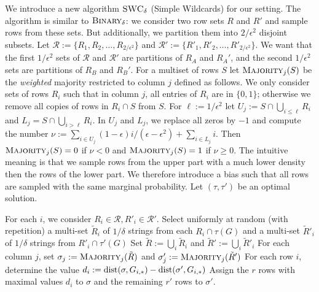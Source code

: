 We introduce a new algorithm $\textsc{SWC}_\delta$ (Simple Wildcards) for our setting.
The algorithm is similar to $\textsc{Binary}_\delta$: we consider two row sets $R$ and $R'$ and sample rows from these sets. 
But additionally, we partition them into  $2/\epsilon^2$ disjoint subsets.
Let $\mathcal{R} := \{R_1,R_2,\dotsc,R_{2/\epsilon^2}\}$ and $\mathcal{R}' := \{R'_1,R'_2,\dotsc,R'_{2/\epsilon^2}\}$.
We want that the first $1/\epsilon^2$ sets of $\mathcal{R}$ and $\mathcal{R}'$ are partitions of $R_A$ and $R_A'$, and the second $1/\epsilon^2$ sets are partitions of $R_B$ and $R_B'$.
For a multiset of rows $S$ let $\textsc{Majority}_j(S)$ be the \emph{weighted} majority restricted to column $j$ defined as follows.
We only consider sets of rows $R_i$ such that in column $j$, all entries of $R_i$ are in $\{0,1\}$; otherwise we remove all copies of rows in $R_i \cap S$ from $S$.
For $\ell := 1/\epsilon^2$ let $U_j := S \cap \bigcup_{i \le \ell} R_i$ and $L_j = S \cap \bigcup_{i > \ell} R_i$.
In $U_j$ and $L_j$, we replace all zeros by $-1$ and compute the number
$\nu := \sum_{i \in U_j} (1-\epsilon)i/(\epsilon - \epsilon^2) + \sum_{i \in L_j} i$. 
Then $\textsc{Majority}_j(S) = 0$ if $\nu <0$ and $\textsc{Majority}_j(S) = 1$ if $\nu \ge 0$.
The intuitive meaning is that we sample rows from the upper part with a much lower density then the rows of the lower part.
We therefore introduce a bias such that all rows are sampled with the same marginal probability.
Let $(\tau,\tau')$ be an optimal solution.

\begin{algorithm} 
    \caption{
    \label{alg:SWC}
    $\textsc{SWC}_\delta$}
  \SetAlgoNoLine
  \SetNlSkip{1em}
  For each $i$, we consider $R_i\in\mathcal{R}, R'_i \in \mathcal{R}'$. Select uniformly at random (with repetition) a multi-set $\tilde{R}_i$ of $1/\delta$ strings from each $R_i \cap \tau(G)$ 
  and a multi-set $\tilde{R}'_i$ of $1/\delta$ strings from $R'_i \cap \tau'(G)$\;
  Set $\tilde{R} := \bigcup_i \tilde{R}_i$ and $\tilde{R}' := \bigcup_i \tilde{R}'_i$
  For each column $j$, set $\sigma_j := \textsc{Majority}_j(\tilde{R})$ and $\sigma'_j := \textsc{Majority}_j(\tilde{R}')$\;
  For each row $i$, determine the value $d_i := \mathrm{dist}(\sigma,G_{i,*}) - \mathrm{dist}(\sigma',G_{i,*})$\;
  Assign the $r$ rows with maximal values $d_i$ to $\sigma$ and the remaining $r'$ rows to $\sigma'$.
\end{algorithm}

